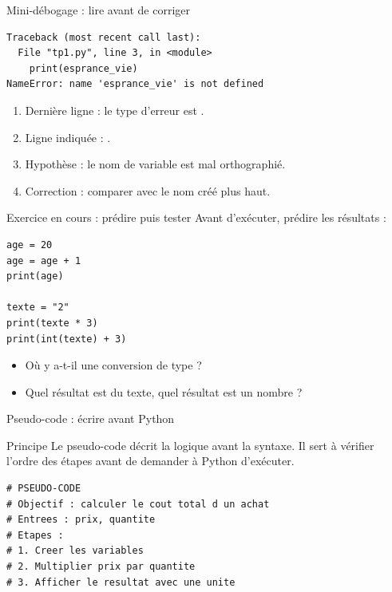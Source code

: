 \documentclass[10pt,aspectratio=169]{beamer}
\begin{document}
\begin{frame}[fragile]{Mini-débogage : lire avant de corriger}
\begin{lstlisting}[language=terminal]
Traceback (most recent call last):
  File "tp1.py", line 3, in <module>
    print(esprance_vie)
NameError: name 'esprance_vie' is not defined
\end{lstlisting}
\begin{enumerate}
  \item Dernière ligne : le type d'erreur est .
  \item Ligne indiquée : .
  \item Hypothèse : le nom de variable est mal orthographié.
  \item Correction : comparer avec le nom créé plus haut.
\end{enumerate}
\end{frame}

\begin{frame}[fragile]{Exercice en cours : prédire puis tester}
Avant d'exécuter, prédire les résultats :
\begin{lstlisting}
age = 20
age = age + 1
print(age)

texte = "2"
print(texte * 3)
print(int(texte) + 3)
\end{lstlisting}
\begin{itemize}
  \item Où y a-t-il une conversion de type ?
  \item Quel résultat est du texte, quel résultat est un nombre ?
\end{itemize}
\end{frame}

\begin{frame}[fragile]{Pseudo-code : écrire avant Python}
\begin{block}{Principe}
Le pseudo-code décrit la logique avant la syntaxe. Il sert à vérifier l’ordre des étapes avant de demander à Python d’exécuter.
\end{block}
\begin{lstlisting}
# PSEUDO-CODE
# Objectif : calculer le cout total d un achat
# Entrees : prix, quantite
# Etapes :
# 1. Creer les variables
# 2. Multiplier prix par quantite
# 3. Afficher le resultat avec une unite
\end{lstlisting}
\end{frame}
\end{document}
